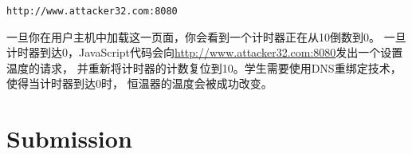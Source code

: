 \begin{lstlisting}
http://www.attacker32.com:8080
\end{lstlisting}
 

一旦你在用户主机中加载这一页面，你会看到一个计时器正在从10倒数到0。
一旦计时器到达0，JavaScript代码会向\url{http://www.attacker32.com:8080}发出一个设置温度的请求，
并重新将计时器的计数复位到10。学生需要使用DNS重绑定技术，使得当计时器到达0时，
恒温器的温度会被成功改变。




\section{Submission}

\seedsubmission



